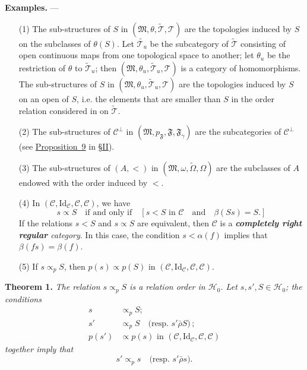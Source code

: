 \documentclass[a4paper,oneside,nobib,nofonts,notitlepage,notoc,nols,fleqn,justified]{tufte-book}
\newenvironment{itenv}[1]
  {\phantomsection\par\medskip\noindent\textbf{#1.}\itshape}
  {\par\medskip}
\newenvironment{rmenv}[1]
  {\phantomsection\par\medskip\noindent\textbf{#1.}\rmfamily}
  {\par\medskip}
\newcommand{\oldpage}[1]{{\reversemarginpar\marginnote{\raggedleft\footnotesize\textit{p.~#1}}}}
\newcommand{\unsure}[1]{{\color{purple}\textbf{#1}}}
\newcommand{\CC}{\mathcal{C}}
\newcommand{\HH}{\mathcal{H}}
\newcommand{\MM}{\mathfrak{M}}
\newcommand{\FF}{\mathfrak{F}}
\newcommand{\TT}{\mathcal{T}}
\newcommand{\relrhobar}{\mathrel{\bar{\rho}}}
\newcommand{\subs}{\mathrel{\propto}}
\newcommand{\Id}{\mathrm{Id}}
\begin{document}
\begin{rmenv}{Examples}
  ---
  \begin{enumerate}
    \item[\normalfont(1)]
      The sub-structures of $S$ in $(\MM,\theta,\widetilde{\TT},\TT)$ are the topologies induced by $S$ on the subclasses of $\theta(S)$.
      Let $\widetilde{\TT_u}$ be the subcategory of $\widetilde{\TT}$ consisting of open continuous maps from one topological space to another;
      let $\theta_u$ be the restriction of $\theta$ to $\widetilde{\TT}_u$;
      then $(\MM,\theta_u,\widetilde{\TT}_u,\TT)$ is a category of homomorphisms.
      The sub-structures of $S$ in $(\MM,\theta_u,\widetilde{\TT}_u,\TT)$ are the topologies induced by $S$ on an open of $S$, i.e. the elements that are smaller than $S$ in the order relation considered in \cite{3c} on $\widetilde{\TT}$.
    \item[\normalfont(2)]
      The sub-structures of $\CC^\perp$ in $(\MM,p_\FF,\FF,\FF_\gamma)$ are the subcategories of $\CC^\perp$ (see \hyperref[proposition:9]{Proposition~9} in \hyperref[section:ii]{§II}).
    \item[\normalfont(3)]
      The sub-structures of $(A,<)$ in $(\MM,\omega,\widetilde{\Omega},\Omega)$ are the subclasses of $A$ endowed with the order induced by $<$.
    \item[\normalfont(4)]
      In $(\CC,\Id_\CC,\CC,\CC)$, we have
      \[
        s\subs S
        \quad\text{if and only if}\quad
        [
          \text{$s<S$ in $\CC$}
          \quad\text{and}\quad
          \beta(Ss)=S.
        ]
      \]
      If the relations $s<S$ and $s\subs S$ are equivalent, then $\CC$ is a \emph{\unsure{completely right regular} category}.
      In this case, the condition $s<\alpha(f)$ implies that $\beta(fs)=\beta(f)$.
    \item[\normalfont(5)]
      If $s\subs_p S$, then $p(s)\subs p(S)$ in $(\CC,\Id_\CC,\CC,\CC)$.
  \end{enumerate}
\end{rmenv}

\begin{itenv}{Theorem 1}
\label{theorem:1}
  \oldpage{362}
  The relation $s\subs_p S$ is a relation order in $\HH_0$.
  Let $s,s',S\in\HH_0$;
  the conditions
  \[
    \begin{aligned}
      s&\subs_p S;
    \\s'&\subs_p S
      \quad\text{(resp. $s'\relrhobar S$)}\,;
    \\p(s')&\subs p(s)\text{ in }(\CC,\Id_\CC,\CC,\CC)
    \end{aligned}
  \]
  together imply that
  \[
    s'\subs_p s
    \quad\text{(resp. $s'\relrhobar s$)}.
  \]
\end{itenv}
\end{document}
